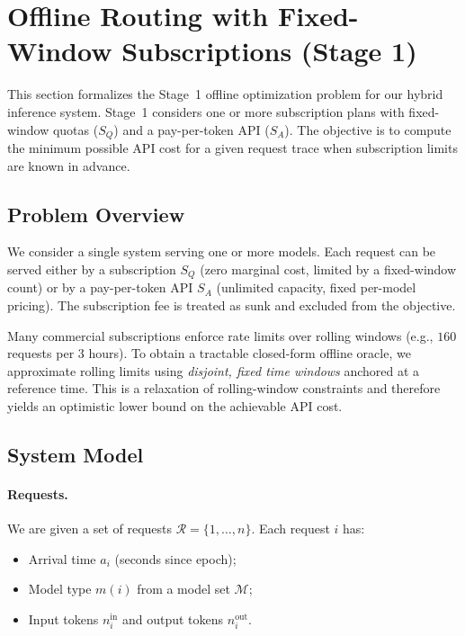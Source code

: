 \documentclass[11pt]{article}
\begin{document}
\section{Offline Routing with Fixed-Window Subscriptions (Stage 1)}
\label{sec:offline-stage1}

This section formalizes the Stage~1 offline optimization problem for our hybrid inference system.
Stage~1 considers one or more subscription plans with fixed-window quotas (\(S_Q\)) and a pay-per-token API (\(S_A\)).
The objective is to compute the minimum possible API cost for a given request trace when subscription limits are known in advance.

\subsection{Problem Overview}
We consider a single system serving one or more models. Each request can be served either by a subscription \(S_Q\) (zero marginal cost, limited by a fixed-window count) or by a pay-per-token API \(S_A\) (unlimited capacity, fixed per-model pricing). The subscription fee is treated as sunk and excluded from the objective.

Many commercial subscriptions enforce rate limits over rolling windows (e.g., \(160\) requests per \(3\) hours). To obtain a tractable closed-form offline oracle, we approximate rolling limits using \emph{disjoint, fixed time windows} anchored at a reference time. This is a relaxation of rolling-window constraints and therefore yields an optimistic lower bound on the achievable API cost.

\subsection{System Model}
\paragraph{Requests.} We are given a set of requests \(\mathcal{R} = \{1,\dots,n\}\). Each request \(i\) has:
\begin{itemize}
  \item Arrival time \(a_i\) (seconds since epoch);
  \item Model type \(m(i)\) from a model set \(\mathcal{M}\);
  \item Input tokens \(n_i^{\text{in}}\) and output tokens \(n_i^{\text{out}}\).
\end{itemize}
\end{document}
